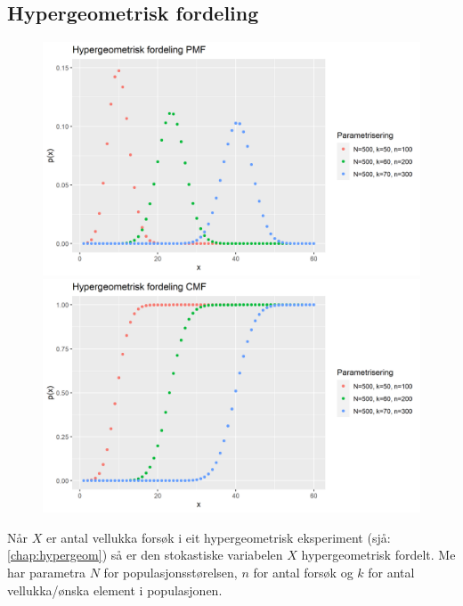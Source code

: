 \subsection{Hypergeometrisk fordeling}
\begin{figure}[H]
  \centering
  \begin{minipage}[b]{0.49\textwidth}
    \includegraphics[width=\textwidth]{bilete/hypergeompmf.png}
  \end{minipage}
  \hfill
  \begin{minipage}[b]{0.49\textwidth}
    \includegraphics[width=\textwidth]{bilete/hypergeomcmf.png}
  \end{minipage}
\end{figure}

Når $X$ er antal vellukka forsøk i eit hypergeometrisk eksperiment (sjå: \ref{chap:hypergeom}) så er den stokastiske variabelen $X$ hypergeometrisk fordelt. Me har parametra $N$ for populasjonsstørelsen, $n$ for antal forsøk og $k$ for antal vellukka/ønska element i populasjonen.

